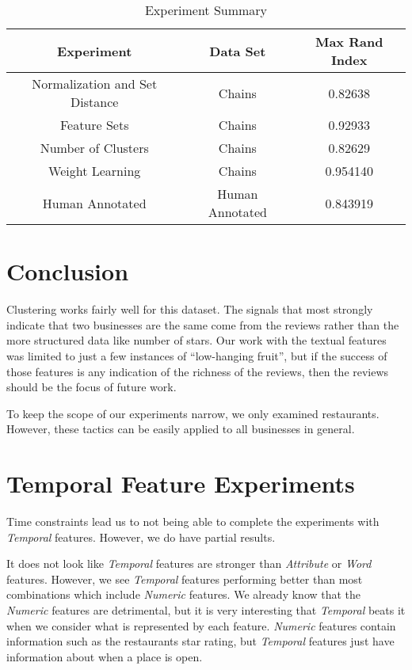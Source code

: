 \documentclass{article}
\begin{document}
   \begin{table}
      \scriptsize
      \begin{center}
         \begin{tabular}{| c | c | c |}
            \hline
               Experiment & Data Set & Max Rand Index \\
            \hline
               Normalization and Set Distance & Chains & 0.82638 \\
               Feature Sets & Chains & 0.92933 \\
               Number of Clusters & Chains & 0.82629 \\
               Weight Learning & Chains & 0.954140 \\
               Human Annotated & Human Annotated & 0.843919 \\
            \hline
         \end{tabular}
         \caption{Experiment Summary}
         \label{tab:experiment-summary}
      \end{center}
   \end{table}

\section{Conclusion}
   Clustering works fairly well for this dataset.
   The signals that most strongly indicate that two businesses are the same come from the reviews rather than the more structured data like number of stars.
   Our work with the textual features was limited to just a few instances of ``low-hanging fruit'',
   but if the success of those features is any indication of the richness of the reviews, then the reviews should be the focus of future work.

   To keep the scope of our experiments narrow, we only examined restaurants.
   However, these tactics can be easily applied to all businesses in general.

\clearpage

\appendix
\appendixpage

\section{Temporal Feature Experiments}
\label{appendix:temporal-features}
   Time constraints lead us to not being able to complete the experiments with \textit{Temporal} features.
   However, we do have partial results.

   It does not look like \textit{Temporal} features are stronger than \textit{Attribute} or \textit{Word} features.
   However, we see \textit{Temporal} features performing better than most combinations which include \textit{Numeric} features.
   We already know that the \textit{Numeric} features are detrimental, but it is very interesting that \textit{Temporal} beats it when we consider what is represented by each feature.
   \textit{Numeric} features contain information such as the restaurants star rating, but \textit{Temporal} features just have information about when a place is open.
\end{document}
